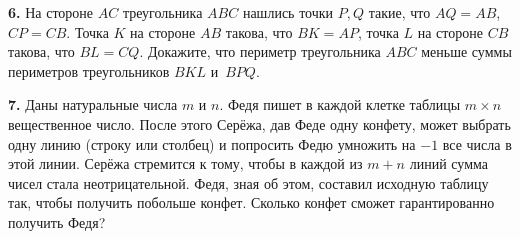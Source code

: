 \documentclass[12pt]{article}
\def\q#1.{{\bf #1. }}
\begin{document}
\q6. На стороне $AC$ треугольника $ABC$ нашлись точки $P,Q$ такие, что $AQ=AB$, $CP=CB$. Точка $K$ на стороне $AB$ такова, что $BK=AP$, точка $L$ на стороне $CB$ такова, что $BL=CQ$. Докажите, что периметр треугольника $ABC$ меньше суммы периметров треугольников $BKL$ и~$BPQ$.

\q7. Даны натуральные числа $m$ и $n$. Федя пишет в каждой клетке таблицы $m\times n$ вещественное число. После этого Серёжа, дав Феде одну конфету, может выбрать одну линию (строку или столбец) и попросить Федю умножить на $-1$ все числа в этой линии. Серёжа стремится к тому, чтобы в каждой из $m+n$ линий сумма чисел стала неотрицательной. Федя, зная об этом, составил исходную таблицу так, чтобы получить побольше конфет. Сколько конфет сможет гарантированно получить Федя?
\end{document}
